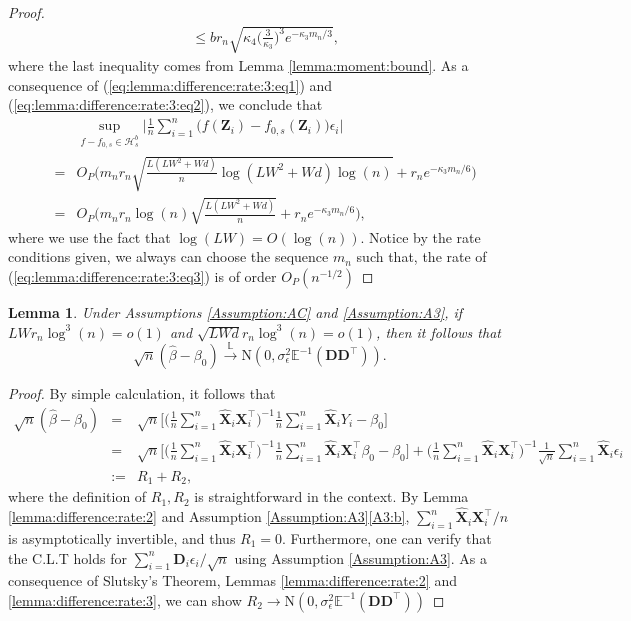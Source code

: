 \documentclass[11pt, preprint]{imsart}
\numberwithin{equation}{section}
\def \mcH{\mathcal{H}}
\def \bfD{\mathbf{D}}
\def \bfX{\mathbf{X}}
\def \bfZ{\mathbf{Z}}
\def \bfD{\mathbf{D}}
\def \ev{\mathbb{E}}
\def \cid{\xrightarrow[\text{}]{\text{$\mathbb{L}$}}}
\theoremstyle{plain}
\newtheorem{lemma}{\indent Lemma}
\theoremstyle{definition}
\begin{document}
\begin{proof}
\begin{align}
	&\leq br_n\sqrt{\kappa_4\bigg(\frac{3}{\kappa_3}\bigg)^3e^{-\kappa_3m_n/3}},\label{eq:lemma:difference:rate:3:eq2}
\end{align}
where the last inequality comes from Lemma \ref{lemma:moment:bound}.
As a consequence of (\ref{eq:lemma:difference:rate:3:eq1}) and (\ref{eq:lemma:difference:rate:3:eq2}), we conclude that
\begin{eqnarray}
	&&\sup_{f-f_{0,s}\in \mcH_s^b}\bigg|\frac{1}{n}\sum_{i=1}^n\bigg(f(\bfZ_i)-f_{0,s}(\bfZ_i)\bigg)\epsilon_i\bigg|\nonumber\\
	&=&O_P\bigg(m_nr_n\sqrt{\frac{L(LW^2+Wd)}{n}\log(LW^2+Wd)\log(n)}+r_ne^{-\kappa_3m_n/6}\bigg)\nonumber\\
	&=&O_P\bigg(m_nr_n\log(n)\sqrt{\frac{L(LW^2+Wd)}{n}}+r_ne^{-\kappa_3m_n/6}\bigg),\label{eq:lemma:difference:rate:3:eq3}
\end{eqnarray}
where we use the fact that $\log(LW)=O(\log(n))$.
Notice by the rate conditions given, we always can choose the sequence $m_n$ such that, the rate of (\ref{eq:lemma:difference:rate:3:eq3}) is of order $O_P(n^{-1/2})$
\end{proof}

\begin{lemma}\label{theorem:asymptotic:distribution}
Under Assumptions \ref{Assumption:AC} and \ref{Assumption:A3}, if  $LWr_n\log^3(n)=o(1)$ and  $\sqrt{LWd}r_n\log^3(n)=o(1)$, then it follows that
\begin{equation*}
	\sqrt{n}(\widehat{\beta}-\beta_0)\cid \textrm{N}(0, \sigma_\epsilon^2 \ev^{-1}(\bfD\bfD^\top)).
\end{equation*}
\end{lemma}   
\begin{proof}
By simple calculation, it follows that
\begin{eqnarray*}
	\sqrt{n}(\widehat{\beta}-\beta_0)&=&\sqrt{n}\bigg[\bigg(\frac{1}{n}\sum_{i=1}^n\widehat{\bfX}_i{\bfX}_i^\top\bigg)^{-1}\frac{1}{n}\sum_{i=1}^n\widehat{\bfX}_iY_i-\beta_0\bigg]\nonumber\\
	&=&\sqrt{n}\bigg[\bigg(\frac{1}{n}\sum_{i=1}^n\widehat{\bfX}_i{\bfX}_i^\top\bigg)^{-1}\frac{1}{n}\sum_{i=1}^n\widehat{\bfX}_i\bfX_i^\top \beta_0-\beta_0\bigg]+\bigg(\frac{1}{n}\sum_{i=1}^n\widehat{\bfX}_i{\bfX}_i^\top\bigg)^{-1}\frac{1}{\sqrt{n}}\sum_{i=1}^n\widehat{\bfX}_i\epsilon_i\nonumber\\
	&:=&R_1+R_2,
\end{eqnarray*}
where the definition of $R_1, R_2$ is straightforward in the context. By Lemma \ref{lemma:difference:rate:2} and Assumption \ref{Assumption:A3}\ref{A3:b}, $\sum_{i=1}^n\widehat{\bfX}_i{\bfX}_i^\top/n$ is asymptotically invertible, and thus $R_1=0$. Furthermore, one can verify that the  C.L.T holds for $\sum_{i=1}^n\bfD_i\epsilon_i/\sqrt{n}$ using Assumption \ref{Assumption:A3}. As a consequence of Slutsky's Theorem, Lemmas \ref{lemma:difference:rate:2} and \ref{lemma:difference:rate:3}, we can show $R_2\to  \textrm{N}(0, \sigma_\epsilon^2 \ev^{-1}(\bfD\bfD^\top))$
\end{proof}
\end{document}
